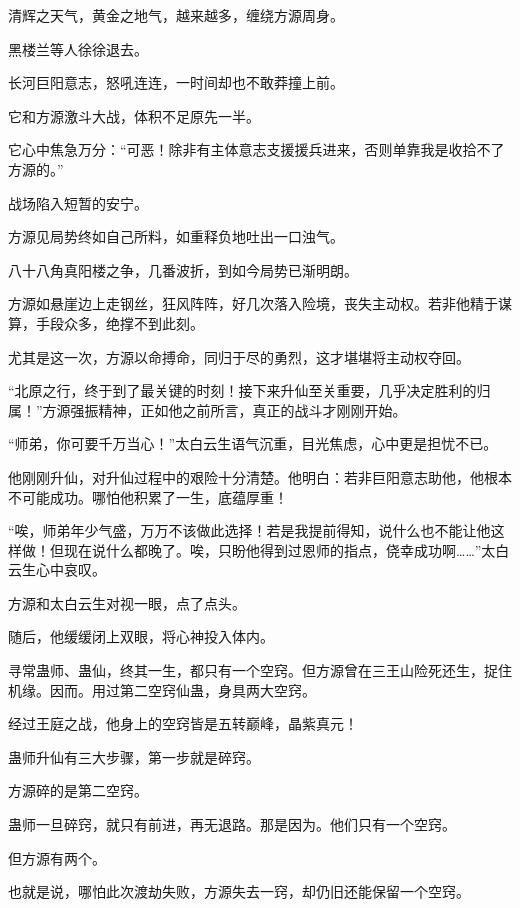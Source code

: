 
\begin{this_body}

清辉之天气，黄金之地气，越来越多，缠绕方源周身。

黑楼兰等人徐徐退去。

长河巨阳意志，怒吼连连，一时间却也不敢莽撞上前。

它和方源激斗大战，体积不足原先一半。

它心中焦急万分：“可恶！除非有主体意志支援援兵进来，否则单靠我是收拾不了方源的。”

战场陷入短暂的安宁。

方源见局势终如自己所料，如重释负地吐出一口浊气。

八十八角真阳楼之争，几番波折，到如今局势已渐明朗。

方源如悬崖边上走钢丝，狂风阵阵，好几次落入险境，丧失主动权。若非他精于谋算，手段众多，绝撑不到此刻。

尤其是这一次，方源以命搏命，同归于尽的勇烈，这才堪堪将主动权夺回。

“北原之行，终于到了最关键的时刻！接下来升仙至关重要，几乎决定胜利的归属！”方源强振精神，正如他之前所言，真正的战斗才刚刚开始。

“师弟，你可要千万当心！”太白云生语气沉重，目光焦虑，心中更是担忧不已。

他刚刚升仙，对升仙过程中的艰险十分清楚。他明白：若非巨阳意志助他，他根本不可能成功。哪怕他积累了一生，底蕴厚重！

“唉，师弟年少气盛，万万不该做此选择！若是我提前得知，说什么也不能让他这样做！但现在说什么都晚了。唉，只盼他得到过恩师的指点，侥幸成功啊……”太白云生心中哀叹。

方源和太白云生对视一眼，点了点头。

随后，他缓缓闭上双眼，将心神投入体内。

寻常蛊师、蛊仙，终其一生，都只有一个空窍。但方源曾在三王山险死还生，捉住机缘。因而。用过第二空窍仙蛊，身具两大空窍。

经过王庭之战，他身上的空窍皆是五转巅峰，晶紫真元！

蛊师升仙有三大步骤，第一步就是碎窍。

方源碎的是第二空窍。

蛊师一旦碎窍，就只有前进，再无退路。那是因为。他们只有一个空窍。

但方源有两个。

也就是说，哪怕此次渡劫失败，方源失去一窍，却仍旧还能保留一个空窍。


\end{this_body}
